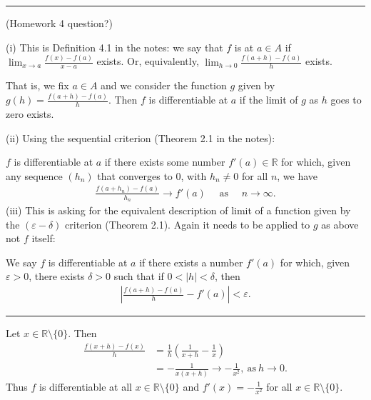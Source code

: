 \documentclass[letterpaper,10pt,english]{jupyterBook}
\begin{document}
\bigskip\hrule\bigskip


\sphinxAtStartPar
{\hyperref[\detokenize{Problems:id38}]{}} (Homework 4 question?)

\sphinxAtStartPar
(i) This is Definition 4.1 in the notes: we say that \(f\) is  at \(a \in A\) if \( \lim_{x \rightarrow a}\frac{f(x) - f(a)}{x - a}\) exists. Or, equivalently, \( \lim_{h \rightarrow 0}\frac{f(a +h) - f(a)}{h}\) exists.

That is, we fix \(a\in A\) and we consider the function \(g\) given by \(g(h)=\frac{f(a +h) - f(a)}{h}\). Then \(f\) is differentiable at \(a\) if the limit of \(g\) as \(h\) goes to zero exists.

\sphinxAtStartPar
(ii) Using the sequential criterion (Theorem 2.1 in the notes):

\(f\) is differentiable at \(a\) if there exists some number \(f'(a) \in \mathbb{R}\) for which, given any sequence \((h_{n})\) that converges to \(0\), with \(h_n\neq 0\) for all \(n\), we have
\begin{equation*}
\begin{split}
\frac{f(a + h_{n}) - f(a)}{h_{n}} \rightarrow f'(a) \hspace{1em} \text{ as } \hspace{1em} n\rightarrow\infty.
\end{split}
\end{equation*}
\sphinxAtStartPar
(iii) This is asking for the equivalent description of limit of a function given by the \((\varepsilon - \delta)\) criterion (Theorem 2.1). Again it needs to be applied to \(g\) as above not \(f\) itself:

We say \(f\) is differentiable at \(a\) if there exists a number \(f'(a)\) for which, given \(\varepsilon>0\), there exists \(\delta > 0\) such that if \(0<|h| < \delta\), then
\begin{equation*}
\begin{split}
\left|\displaystyle\frac{f(a+h) - f(a)}{h} - f'(a)\right| < \varepsilon.
\end{split}
\end{equation*}

\bigskip\hrule\bigskip


\sphinxAtStartPar
{\hyperref[\detokenize{Problems:id39}]{}} Let \(x\in\mathbb{R}\setminus\{0\}\). Then
\begin{align*}
\frac{f(x + h) -f(x)}{h} &= \frac{1}{h}\left(\frac{1}{x+ h} -\frac{1}{x}\right)\\
&= -\frac{1}{x(x+h)} \rightarrow -\frac{1}{x^{2}},~\mbox{as}~h \rightarrow 0. 
\end{align*}
\sphinxAtStartPar
Thus \(f\) is differentiable at all \(x\in\mathbb{R}\setminus\{0\}\) and \(f'(x)=-\frac{1}{x^2}\) for all \(x\in\mathbb{R}\setminus\{0\}\).
\end{document}
